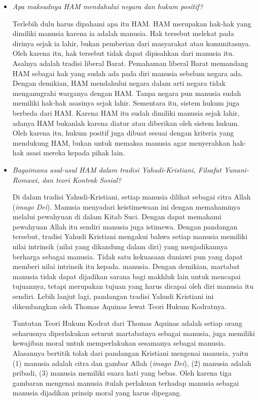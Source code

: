 \documentclass[11pt,twoside,a5paper,openany]{memoir}
\begin{document}
\begin{itemize}
\item
  \emph{Apa maksudnya HAM mendahului negara dan hukum positif?}

  Terlebih dulu harus dipahami apa itu HAM. HAM merupakan hak-hak yang
  dimiliki manusia karena ia adalah manusia. Hak tersebut melekat pada
  dirinya sejak ia lahir, bukan pemberian dari masyarakat atau
  komunitasnya. Oleh karena itu, hak tersebut tidak dapat dipisahkan
  dari manusia itu. Asalnya adalah tradisi liberal Barat. Pemahaman
  liberal Barat memandang HAM sebagai hak yang sudah ada pada diri
  manusia sebelum negara ada. Dengan demikian, HAM mendahului negara
  dalam arti negara tidak menganugrahi warganya dengan HAM. Tanpa negara
  pun manusia sudah memiliki hak-hak asasinya sejak lahir. Sementara
  itu, sistem hukum juga berbeda dari HAM. Karena HAM itu sudah dimiliki
  manusia sejak lahir, adanya HAM bukanlah karena diatur atau diberikan
  oleh sistem hukum. Oleh karena itu, hukum positif juga dibuat sesuai
  dengan kriteria yang mendukung HAM, bukan untuk memaksa manusia agar
  menyerahkan hak-hak asasi mereka kepada pihak lain.
\item
  \emph{Bagaimana asal-usul HAM dalam tradisi Yahudi-Kristiani, Filsafat
  Yunani-Romawi, dan teori Kontrak Sosial?}

  Di dalam tradisi Yahudi-Kristiani, setiap manusia dilihat sebagai
  citra Allah (\emph{imago Dei}). Manusia menyadari keistimewaan ini
  dengan memahaminya melalui pewahyuan di dalam Kitab Suci. Dengan dapat
  memahami pewahyuan Allah itu sendiri manusia juga istimewa. Dengan
  pandangan tersebut, tradisi Yahudi Kristiani mengakui bahwa setiap
  manusia memiliki nilai intrinsik (nilai yang dikandung dalam diri)
  yang menjadikannya berharga sebagai manusia. Tidak satu kekuasaan
  duniawi pun yang dapat memberi nilai intrinsik itu kepada. manusia.
  Dengan demikian, martabat manusia tidak dapat dijadikan sarana bagi
  makhluk lain untuk mencapai tujuannya, tetapi merupakan tujuan yang
  harus dicapai oleh diri manusia itu sendiri. Lebih lanjut lagi,
  pandangan tradisi Yahudi Kristiani ini dikembangkan oleh Thomas
  Aquinas lewat Teori Hukum Kodratnya.

  Tuntutan Teori Hukum Kodrat dari Thomas Aquinas adalah setiap orang
  seharusnya diperlakukan seturut martabatnya sebagai manusia, juga
  memiliki kewajiban moral untuk memperlakukan sesamanya sebagai
  manusia. Alasannya bertitik tolak dari pandangan Kristiani mengenai
  manusia, yaitu (1) manusia adalah citra dan gambar Allah (\emph{imago
  Dei}), (2) manusia adalah pribadi, (3) manusia memiliki suara hati
  yang bebas. Oleh karena tiga gambaran mengenai manusia itulah
  perlakuan terhadap manusia sebagai manusia dijadikan prinsip moral
  yang harus dipegang.


\end{itemize}
\end{document}

